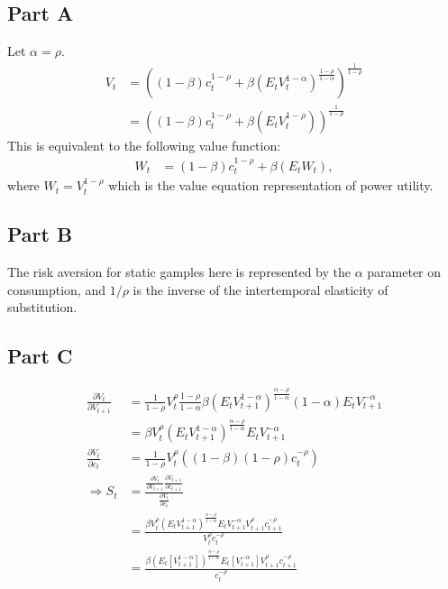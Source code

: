 \documentclass[11pt]{article} %
\begin{document}
\subsection{Part A}
Let $\alpha = \rho$.
\begin{align*}
V_t &= \left( (1-\beta) c_t^{1-\rho} + \beta(E_tV_t^{1-\alpha})^{\frac{1-\rho}{1-\alpha}} \right)^{\frac{1}{1-\rho}}\\
&= \left( (1-\beta) c_t^{1-\rho} + \beta(E_tV_t^{1-\rho}) \right)^{\frac{1}{1-\rho}}
\end{align*}
This is equivalent to the following value function:
\begin{align*}
W_t &= (1-\beta) c_t^{1-\rho} + \beta(E_tW_t),
\end{align*}
where $W_t = V_t^{1-\rho}$ which is the value equation representation of power utility.
\subsection{Part B}
The risk aversion for static gamples here is represented by the $\alpha$ parameter on consumption, and $1/\rho$ is the inverse of the intertemporal elasticity of substitution.
\subsection{Part C}
\begin{align*}
\frac{\partial V_t}{\partial V_{t+1}} &= \frac{1}{1-\rho}V_t^{\rho}\frac{1-\rho}{1-\alpha}\beta (E_tV_{t+1}^{1-\alpha})^{\frac{\alpha-\rho}{1-\alpha}}(1-\alpha)E_tV_{t+1}^{-\alpha} \\
&= \beta V_t^{\rho}  (E_tV_{t+1}^{1-\alpha})^{\frac{\alpha-\rho}{1-\alpha}} E_tV_{t+1}^{-\alpha}\\
\frac{\partial V_{t}}{\partial c_{t}} &=\frac{1}{1-\rho}V_t^{\rho}((1-\beta)(1-\rho)c_t^{-\rho}) \\
\Rightarrow S_t &= \frac{\frac{\partial V_t}{\partial V_{t+1}}\frac{\partial V_{t+1}}{\partial c_{t+1}} }{\frac{\partial V_{t}}{\partial c_{t}} }\\
&= \frac{ \beta V_t^{\rho}  (E_tV_{t+1}^{1-\alpha})^{\frac{\alpha-\rho}{1-\alpha}} E_tV_{t+1}^{-\alpha}V_{t+1}^{\rho}c_{t+1}^{-\rho} }{V_t^{\rho}c_t^{-\rho} }\\
&= \frac{ \beta  (E_t[V_{t+1}^{1-\alpha}])^{\frac{\alpha-\rho}{1-\alpha}} E_t[V_{t+1}^{-\alpha}]V_{t+1}^{\rho}c_{t+1}^{-\rho} }{c_t^{-\rho} } 
\end{align*}
\end{document}
